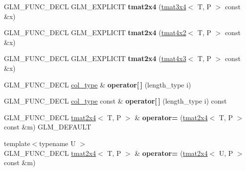 \begin{DoxyCompactItemize}
\item 
\mbox{\label{structglm_1_1tmat2x4_aff5a2bf784029b260a810cf84ff5f228}} 
G\+L\+M\+\_\+\+F\+U\+N\+C\+\_\+\+D\+E\+CL G\+L\+M\+\_\+\+E\+X\+P\+L\+I\+C\+IT {\bfseries tmat2x4} (\hyperlink{structglm_1_1tmat3x4}{tmat3x4}$<$ T, P $>$ const \&x)
\item 
\mbox{\label{structglm_1_1tmat2x4_a871b56fba1a79bfe5b48920c388ef607}} 
G\+L\+M\+\_\+\+F\+U\+N\+C\+\_\+\+D\+E\+CL G\+L\+M\+\_\+\+E\+X\+P\+L\+I\+C\+IT {\bfseries tmat2x4} (\hyperlink{structglm_1_1tmat4x2}{tmat4x2}$<$ T, P $>$ const \&x)
\item 
\mbox{\label{structglm_1_1tmat2x4_ae3ecb4edcc52b02b181e07a44d0511c8}} 
G\+L\+M\+\_\+\+F\+U\+N\+C\+\_\+\+D\+E\+CL G\+L\+M\+\_\+\+E\+X\+P\+L\+I\+C\+IT {\bfseries tmat2x4} (\hyperlink{structglm_1_1tmat4x3}{tmat4x3}$<$ T, P $>$ const \&x)
\item 
\mbox{\label{structglm_1_1tmat2x4_a2bc91eaefd3d2fb68c70a5c0266f7be3}} 
G\+L\+M\+\_\+\+F\+U\+N\+C\+\_\+\+D\+E\+CL \hyperlink{structglm_1_1tvec4}{col\+\_\+type} \& {\bfseries operator\mbox{[}$\,$\mbox{]}} (length\+\_\+type i)
\item 
\mbox{\label{structglm_1_1tmat2x4_a67d9d9d46fd65a05c4752da243faea64}} 
G\+L\+M\+\_\+\+F\+U\+N\+C\+\_\+\+D\+E\+CL \hyperlink{structglm_1_1tvec4}{col\+\_\+type} const  \& {\bfseries operator\mbox{[}$\,$\mbox{]}} (length\+\_\+type i) const
\item 
\mbox{\label{structglm_1_1tmat2x4_a6b28f8306b71c409138050173a41dc7e}} 
G\+L\+M\+\_\+\+F\+U\+N\+C\+\_\+\+D\+E\+CL \hyperlink{structglm_1_1tmat2x4}{tmat2x4}$<$ T, P $>$ \& {\bfseries operator=} (\hyperlink{structglm_1_1tmat2x4}{tmat2x4}$<$ T, P $>$ const \&m) G\+L\+M\+\_\+\+D\+E\+F\+A\+U\+LT
\item 
\mbox{\label{structglm_1_1tmat2x4_abec672d9eb6e8a3a6bdb0ffe46b1f3c7}} 
{\footnotesize template$<$typename U $>$ }\\G\+L\+M\+\_\+\+F\+U\+N\+C\+\_\+\+D\+E\+CL \hyperlink{structglm_1_1tmat2x4}{tmat2x4}$<$ T, P $>$ \& {\bfseries operator=} (\hyperlink{structglm_1_1tmat2x4}{tmat2x4}$<$ U, P $>$ const \&m)

\end{DoxyCompactItemize}
